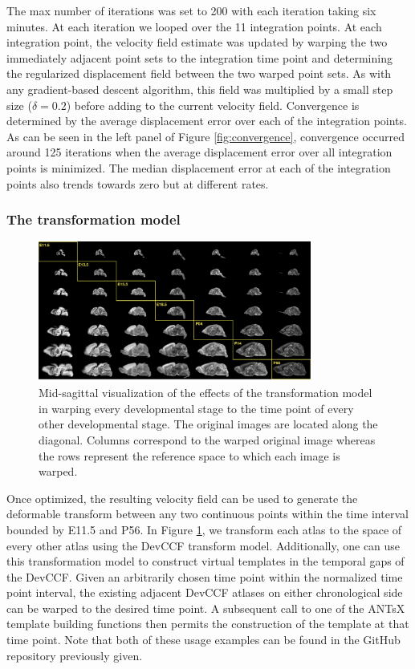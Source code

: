 \documentclass[
  12pt,
]{article}
\begin{document}
The max number of iterations was set to 200 with each iteration taking
six minutes. At each iteration we looped over the 11 integration points.
At each integration point, the velocity field estimate was updated by
warping the two immediately adjacent point sets to the integration time
point and determining the regularized displacement field between the two
warped point sets. As with any gradient-based descent algorithm, this
field was multiplied by a small step size (\(\delta = 0.2\)) before
adding to the current velocity field. Convergence is determined by the
average displacement error over each of the integration points. As can
be seen in the left panel of Figure \ref{fig:convergence}, convergence
occurred around 125 iterations when the average displacement error over
all integration points is minimized. The median displacement error at
each of the integration points also trends towards zero but at different
rates.

\hypertarget{the-transformation-model}{%
\subsubsection{The transformation
model}\label{the-transformation-model}}

\begin{figure}[!htb]
\centering
\includegraphics[width=0.8\textwidth]{Figures/CrossWarp.pdf}
\caption{Mid-sagittal visualization of the effects of the transformation model in
warping every developmental stage to the time point of every other developmental
stage.  The original images are located along the diagonal.  Columns correspond
to the warped original image whereas the rows represent the reference space to which
each image is warped.}
\label{fig:crosswarp}
\end{figure}

Once optimized, the resulting velocity field can be used to generate the
deformable transform between any two continuous points within the time
interval bounded by E11.5 and P56. In Figure \ref{fig:crosswarp}, we
transform each atlas to the space of every other atlas using the DevCCF
transform model. Additionally, one can use this transformation model to
construct virtual templates in the temporal gaps of the DevCCF. Given an
arbitrarily chosen time point within the normalized time point interval,
the existing adjacent DevCCF atlases on either chronological side can be
warped to the desired time point. A subsequent call to one of the ANTsX
template building functions then permits the construction of the
template at that time point. Note that both of these usage examples can
be found in the GitHub repository previously given.
\end{document}

